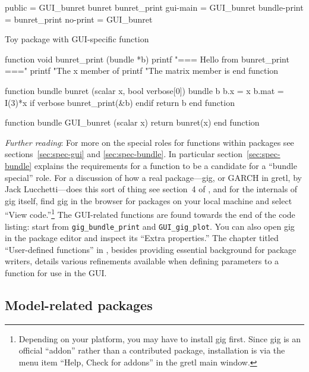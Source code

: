 \documentclass[oneside]{book}
\begin{document}
\begin{code}
public = GUI_bunret bunret bunret_print
gui-main = GUI_bunret
bundle-print = bunret_print
no-print = GUI_bunret
\end{code}

\begin{script}[htbp]
\caption{Toy package with GUI-specific function}
\label{ex:bunret}
\begin{scode}
function void bunret_print (bundle *b)
  printf "=== Hello from bunret_print ===\n\n"
  printf "The x member of %
  printf "The matrix member is\n\n%
end function

function bundle bunret (scalar x, bool verbose[0])
  bundle b
  b.x = x
  b.mat = I(3)*x
  if verbose
    bunret_print(&b)
  endif
  return b
end function

function bundle GUI_bunret (scalar x)
  return bunret(x)
end function
\end{scode}
\end{script}

\textit{Further reading}: For more on the special roles for functions
within packages see sections~\ref{sec:spec-gui} and
\ref{sec:spec-bundle}. In particular section~\ref{sec:spec-bundle}
explains the requirements for a function to be a candidate for a
``bundle special'' role. For a discussion of how a real
package---\textsf{gig}, or GARCH in gretl, by Jack Lucchetti---does
this sort of thing see section~4 of \cite{addons-bundles}, and for the
internals of \textsf{gig} itself, find \textsf{gig} in the browser for
packages on your local machine and select ``View
code.''\footnote{Depending on your platform, you may have to install
  gig first. Since \textsf{gig} is an official ``addon'' rather than a
  contributed package, installation is via the menu item ``Help, Check
  for addons'' in the gretl main window.} The GUI-related functions
are found towards the end of the code listing: start from
\texttt{gig\_bundle\_print} and \texttt{GUI\_gig\_plot}. You can also
open \textsf{gig} in the package editor and inspect its ``Extra
properties.'' The chapter titled ``User-defined functions'' in
\cite{GUG}, besides providing essential background for package
writers, details various refinements available when defining
parameters to a function for use in the GUI.

\subsection{Model-related packages}
\end{document}
